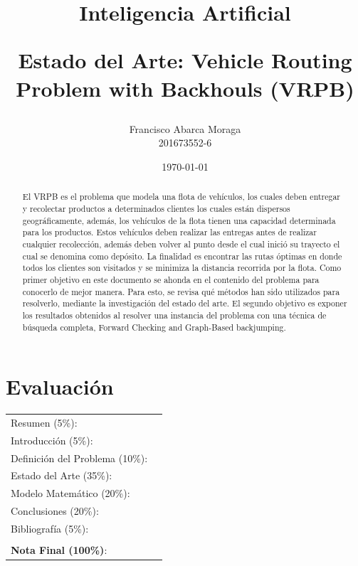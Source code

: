 \documentclass[letter, 10pt]{article}
\begin{document}
\title{Inteligencia Artificial \\ \begin{Large}Estado del Arte: Vehicle Routing Problem with Backhouls (VRPB)\end{Large}}
\author{Francisco Abarca Moraga\\201673552-6}
\date{\today}
\maketitle


\section*{Evaluaci\'on}

\begin{tabular}{ll}
Resumen (5\%): & \underline{\hspace{2cm}} \\
Introducci\'on (5\%):  & \underline{\hspace{2cm}} \\
Definici\'on del Problema (10\%):  & \underline{\hspace{2cm}} \\
Estado del Arte (35\%):  & \underline{\hspace{2cm}} \\
Modelo Matem\'atico (20\%): &  \underline{\hspace{2cm}}\\
Conclusiones (20\%): &  \underline{\hspace{2cm}}\\
Bibliograf\'ia (5\%): & \underline{\hspace{2cm}}\\
 &  \\
\textbf{Nota Final (100\%)}:   & \underline{\hspace{2cm}}
\end{tabular}
\vspace{2cm}


\begin{abstract}
El VRPB es el problema que modela una flota de vehículos, los cuales deben entregar y recolectar productos a determinados clientes los cuales están dispersos geográficamente, además, los vehículos de la flota tienen una capacidad determinada para los productos. Estos vehículos deben realizar las entregas antes de realizar cualquier recolección, además deben volver al punto desde el cual inició su trayecto el cual se denomina como depósito. La finalidad es encontrar las rutas óptimas en donde todos los clientes son visitados y se minimiza la distancia recorrida por la flota. Como primer objetivo en este documento se ahonda en el contenido del problema para conocerlo de mejor manera. Para esto, se revisa qué métodos han sido utilizados para resolverlo, mediante la investigación del estado del arte. El segundo objetivo es exponer los resultados obtenidos al resolver una instancia del problema con una técnica de búsqueda completa, Forward Checking and Graph-Based backjumping.
\end{abstract}
\end{document}
